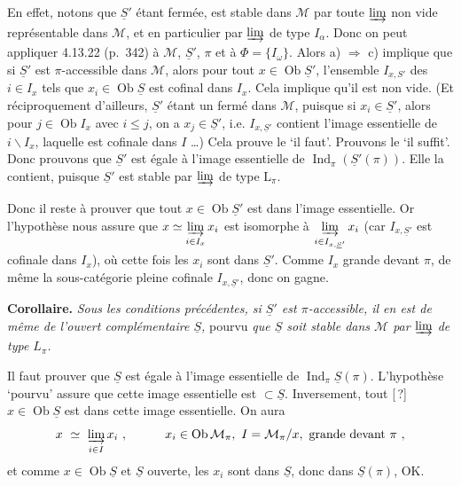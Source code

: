 En effet, notons que $\underline{S}'$ étant fermée, est stable dans $\mathcal{M}$ par toute $\mathop{\underrightarrow{\mathrm{lim}}}$ non vide représentable dans $\mathcal{M}$, et en particulier par $\mathop{\underrightarrow{\mathrm{lim}}}$ de type $I_\alpha$. Donc on peut appliquer 4.13.22 (p.~342) à $\mathcal{M}$, $\underline{S}'$, $\pi$ et à $\Phi=\{I_\omega\}$. Alors a) $\Longrightarrow$ c) implique que si $\underline{S}'$ est $\pi$-accessible dans $\mathcal{M}$, alors pour tout $x\in\operatorname{Ob}\underline{S}'$, l'ensemble $I_{x,S'}$ des $i\in I_x$ tels que $x_i\in\operatorname{Ob}\underline{S}$ est cofinal dans $I_x$. Cela implique qu'il est non vide. (Et réciproquement d'ailleurs, $\underline{S}'$ étant un fermé dans $\mathcal{M}$, puisque si $x_i\in\underline{S}'$, alors pour $j\in\operatorname{Ob}I_x$ avec $i\leqslant j$, on a $x_j\in\underline{S}'$, i.e. $I_{x,\underline{S}'}$ contient l'image essentielle de $i\backslash I_x$, laquelle est cofinale dans $I$ \dots) Cela prouve le `il faut'. Prouvons le `il suffit'. Donc prouvons que $\underline{S}'$ est égale à l'image essentielle de $\operatorname{Ind}_\pi(\underline{S}'(\pi))$. Elle la contient, puisque $\underline{S}'$ est stable par $\mathop{\underrightarrow{\mathrm{lim}}}$ de type $\mathrm{L}_\pi$. %

Donc il reste à prouver que tout $x\in\operatorname{Ob}\underline{S}'$ est dans l'image essentielle. Or l'hypothèse nous assure que $x\simeq\mathop{\underrightarrow{\mathrm{lim}}}\limits_{i\in I_x}x_i$ est isomorphe à $\mathop{\underrightarrow{\mathrm{lim}}}\limits_{i\in I_{x,\underline{S}'}}x_i$ (car $I_{x,\underline{S}'}$ est cofinale dans $I_x$), où cette fois les $x_i$ sont dans $\underline{S}'$. Comme $I_x$ grande devant $\pi$, de même la sous-catégorie pleine cofinale $I_{x,\underline{S}'}$, donc on gagne.

\textbf{Corollaire.} \textit{Sous les conditions précédentes, si $\underline{S}'$ est $\pi$-accessible, il en est de même de l'ouvert complémentaire $\underline{S}$,} pourvu \textit{que $\underline{S}$ soit stable dans $\mathcal{M}$ par $\mathop{\underrightarrow{\mathrm{lim}}}$ de type $L_\pi$.}

Il faut prouver que $\underline{S}$ est égale à l'image essentielle de $\operatorname{Ind}_\pi\underline{S}(\pi)$. L'hypothèse `pourvu' assure que cette image essentielle est $\subset\underline{S}$. Inversement, tout [\,?] $x\in\operatorname{Ob}\underline{S}$ est dans cette image essentielle. On aura
\[
x\ \simeq\ \limind_{i\in I}x_i\ ,\qquad\quad x_i\in\operatorname{Ob}\mathcal{M}_\pi,\ I=\mathcal{M}_\pi/x,\ \text{grande devant } \pi\ ,
\]
et comme $x\in\operatorname{Ob}\underline{S}$ et $\underline{S}$ ouverte, les $x_i$ sont dans $\underline{S}$, donc dans $\underline{S}(\pi)$, OK.

